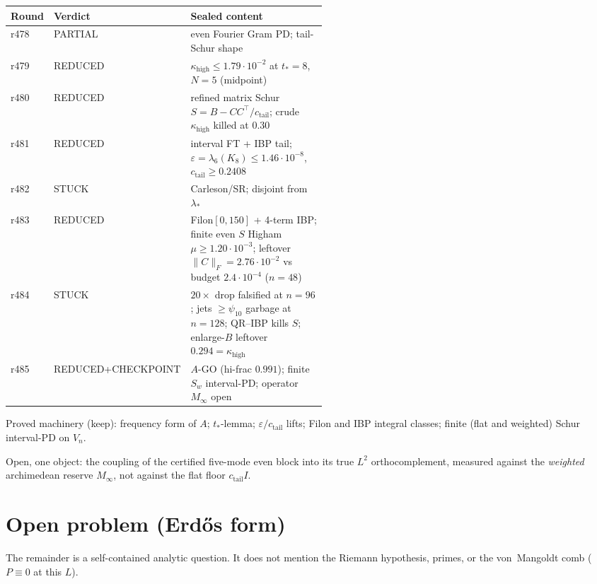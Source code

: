 \documentclass[11pt]{article}
\theoremstyle{remark}
\newcommand{\Minf}{M_{\infty}}
\begin{document}
\begin{center}
\small
\begin{tabular}{@{}llp{0.52\linewidth}@{}}
\toprule
Round & Verdict & Sealed content \\
\midrule
r478 & PARTIAL
  & even Fourier Gram PD; tail-Schur shape \\
r479 & REDUCED
  & $\kappa_{\mathrm{high}}\le1.79\cdot10^{-2}$ at
    $t_*=8$, $N=5$ (midpoint) \\
r480 & REDUCED
  & refined matrix Schur
    $S=B-CC^\top/c_{\mathrm{tail}}$;
    crude $\kappa_{\mathrm{high}}$ killed at $0.30$ \\
r481 & REDUCED
  & interval FT + IBP tail;
    $\varepsilon=\lambda_6(K_8)\le1.46\cdot10^{-8}$,
    $c_{\mathrm{tail}}\ge0.2408$ \\
r482 & STUCK
  & Carleson/SR; disjoint from $\lambda_*$ \\
r483 & REDUCED
  & Filon$[0,150]$ + 4-term IBP;
    finite even $S$ Higham $\mu\ge1.20\cdot10^{-3}$;
    leftover $\|C\|_F=2.76\cdot10^{-2}$ vs budget
    $2.4\cdot10^{-4}$ ($n=48$) \\
r484 & STUCK
  & $20\times$ drop falsified at $n=96$;
    jets $\ge\psi_{10}$ garbage at $n=128$;
    QR--IBP kills $S$;
    enlarge-$B$ leftover $0.294=\kappa_{\mathrm{high}}$ \\
r485 & REDUCED+CHECKPOINT
  & $A$-GO (hi-frac $0.991$);
    finite $S_w$ interval-PD;
    operator $\Minf$ open \\
\bottomrule
\end{tabular}
\end{center}

Proved machinery (keep):
frequency form of $A$;
$t_*$-lemma;
$\varepsilon/c_{\mathrm{tail}}$ lifts;
Filon and IBP integral classes;
finite (flat and weighted) Schur interval-PD on $V_n$.

Open, one object:
the coupling of the certified five-mode even block
into its true $L^2$ orthocomplement, measured against
the \emph{weighted} archimedean reserve $\Minf$,
not against the flat floor $c_{\mathrm{tail}}I$.

\section{Open problem (Erd\H{o}s form)}

The remainder is a self-contained analytic question.
It does not mention the Riemann hypothesis, primes,
or the von~Mangoldt comb ($P\equiv0$ at this $L$).
\end{document}

